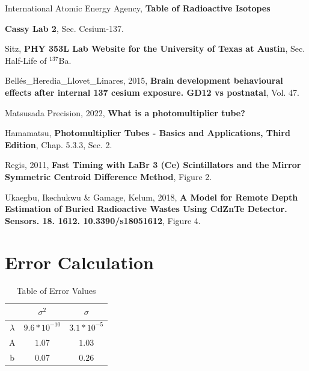 \documentclass[10pt,letterpaper,onecolumn]{article}
\begin{document}
\pagebreak

\begin{thebibliography}{9}

International Atomic Energy Agency, {\bf Table of Radioactive Isotopes}

{\bf Cassy Lab 2}, Sec. Cesium-137.

Sitz, {\bf PHY 353L Lab Website for the University of Texas at Austin}, Sec. Half-Life of $^{137}$Ba.

Bellés\_Heredia\_Llovet\_Linares, 2015, {\bf Brain development behavioural effects after internal 137 cesium exposure. GD12 vs postnatal}, Vol. 47.

Matsusada Precision, 2022, {\bf What is a photomultiplier tube?}

Hamamatsu, {\bf Photomultiplier Tubes - Basics and Applications, Third Edition}, Chap. 5.3.3, Sec. 2.

Regis, 2011, {\bf Fast Timing with LaBr 3 (Ce) Scintillators and the Mirror Symmetric Centroid Difference Method}, Figure 2.

Ukaegbu, Ikechukwu & Gamage, Kelum, 2018, {\bf A Model for Remote Depth Estimation of Buried Radioactive Wastes Using CdZnTe Detector. Sensors. 18. 1612. 10.3390/s18051612}, Figure 4.


\end{thebibliography}

\appendixpage
\section{Error Calculation}
\begin{table}[h]

{
{%
\begin {center}
\begin {tabular} {c | c | c }
\hline\hline
 & $\sigma^{2}$ & $\sigma$ \\
\hline
$\lambda$ &	$9.6*10^{-10}$ & $3.1*10^{-5}$\\
\hline
A	& $1.07$ & $1.03$ \\
\hline
b & $0.07$ & $0.26$ \\
\hline
\end {tabular}
\end {center}
}
}
\caption {\label{tab:events}
Table of Error Values
 }

\end{table}
\end{document}
